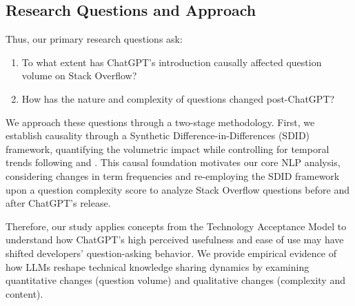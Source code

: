 \subsection{Research Questions and Approach}
Thus, our primary research questions ask: 
\begin{enumerate}
    \item To what extent has ChatGPT's introduction causally affected question volume on Stack Overflow?
    \item How has the nature and complexity of questions changed post-ChatGPT?
\end{enumerate}

We approach these questions through a two-stage methodology. First, we establish causality through a Synthetic Difference-in-Differences (SDID) framework, quantifying the volumetric impact while controlling for temporal trends following \textcite{arkhangelsky_synthetic_2021} and \textcite{clarke_synthetic_2023}. This causal foundation motivates our core NLP analysis, considering changes in term frequencies and re-employing the SDID framework upon a question complexity score to analyze Stack Overflow questions before and after ChatGPT's release.

Therefore, our study applies concepts from the Technology Acceptance Model to understand how ChatGPT's high perceived usefulness and ease of use may have shifted developers' question-asking behavior. We provide empirical evidence of how LLMs reshape technical knowledge sharing dynamics by examining quantitative changes (question volume) and qualitative changes (complexity and content).

